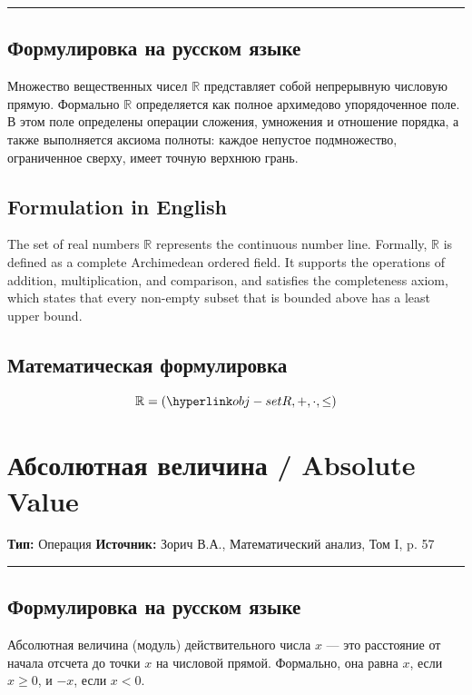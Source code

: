 \documentclass[12pt,a4paper]{report}
\begin{document}
\vspace{0.5em}
\hrule
\vspace{1em}

\section*{Формулировка на русском языке}
Множество вещественных чисел $\mathbb{R}$ представляет собой непрерывную числовую прямую. Формально $\mathbb{R}$ определяется как полное архимедово упорядоченное поле. В этом поле определены операции сложения, умножения и отношение порядка, а также выполняется аксиома полноты: каждое непустое подмножество, ограниченное сверху, имеет точную верхнюю грань.

\section*{Formulation in English}
The set of real numbers $\mathbb{R}$ represents the continuous number line. Formally, $\mathbb{R}$ is defined as a complete Archimedean ordered field. It supports the operations of addition, multiplication, and comparison, and satisfies the completeness axiom, which states that every non-empty subset that is bounded above has a least upper bound.

\section*{Математическая формулировка}
\hypertarget{obj-real-numbers}{}
\hypertarget{obj-real-numbers}{}
\begin{object}



\[ \mathbb{R} = (\entityref{obj-set}{R}, +, \cdot, \leq) \]
\end{object}

\chapter{Абсолютная величина / Absolute Value}\label{entity:op-abs-abstract}
\textbf{Тип:} Операция \hfill \textbf{Источник:} Зорич В.А., Математический анализ, Том I, p. 57

\vspace{0.5em}
\hrule
\vspace{1em}

\section*{Формулировка на русском языке}
Абсолютная величина (модуль) действительного числа $x$ — это расстояние от начала отсчета до точки $x$ на числовой прямой. Формально, она равна $x$, если $x \geq 0$, и $-x$, если $x < 0$.
\end{document}
